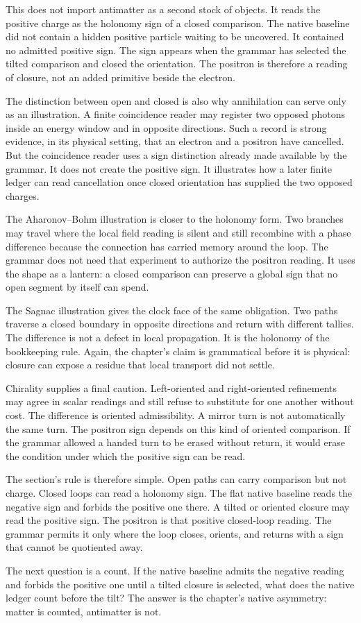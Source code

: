 This does not import antimatter as a second stock of objects. It reads the
positive charge as the holonomy sign of a closed comparison. The native
baseline did not contain a hidden positive particle waiting to be uncovered.
It contained no admitted positive sign. The sign appears when the grammar
has selected the tilted comparison and closed the orientation. The positron
is therefore a reading of closure, not an added primitive beside the
electron.

The distinction between open and closed is also why annihilation can serve
only as an illustration. A finite coincidence reader may register two
opposed photons inside an energy window and in opposite directions. Such a
record is strong evidence, in its physical setting, that an electron and a
positron have cancelled. But the coincidence reader uses a sign distinction
already made available by the grammar. It does not create the positive sign.
It illustrates how a later finite ledger can read cancellation once closed
orientation has supplied the two opposed charges.

The Aharonov--Bohm illustration is closer to the holonomy form. Two branches
may travel where the local field reading is silent and still recombine with
a phase difference because the connection has carried memory around the
loop. The grammar does not need that experiment to authorize the positron
reading. It uses the shape as a lantern: a closed comparison can preserve a
global sign that no open segment by itself can spend.

The Sagnac illustration gives the clock face of the same obligation. Two
paths traverse a closed boundary in opposite directions and return with
different tallies. The difference is not a defect in local propagation. It is
the holonomy of the bookkeeping rule. Again, the chapter's claim is
grammatical before it is physical: closure can expose a residue that local
transport did not settle.

Chirality supplies a final caution. Left-oriented and right-oriented
refinements may agree in scalar readings and still refuse to substitute for
one another without cost. The difference is oriented admissibility. A mirror
turn is not automatically the same turn. The positron sign depends on this
kind of oriented comparison. If the grammar allowed a handed turn to be
erased without return, it would erase the condition under which the positive
sign can be read.

The section's rule is therefore simple. Open paths can carry comparison but
not charge. Closed loops can read a holonomy sign. The flat native baseline
reads the negative sign and forbids the positive one there. A tilted or
oriented closure may read the positive sign. The positron is that positive
closed-loop reading. The grammar permits it only where the loop closes,
orients, and returns with a sign that cannot be quotiented away.

The next question is a count. If the native baseline admits the negative
reading and forbids the positive one until a tilted closure is selected, what
does the native ledger count before the tilt? The answer is the chapter's
native asymmetry: matter is counted, antimatter is not.
